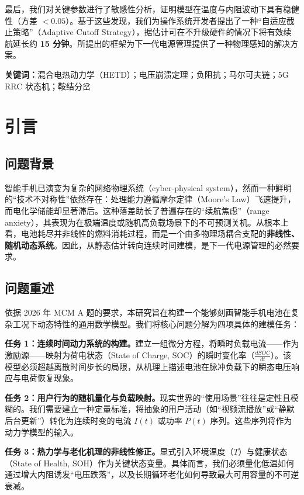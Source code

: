 \documentclass[11pt,a4paper]{ctexart}
\begin{document}
最后，我们对关键参数进行了敏感性分析，证明模型在温度与内阻波动下具有稳健性（方差 $< 0.05$）。基于这些发现，我们为操作系统开发者提出了一种“自适应截止策略”（Adaptive Cutoff Strategy），据估计可在不升级硬件的情况下将有效续航延长约 \textbf{15 分钟}。所提出的框架为下一代电源管理提供了一种物理感知的解决方案。

\noindent\textbf{关键词：}混合电热动力学（HETD）；电压崩溃定理；负阻抗；马尔可夫链；5G RRC 状态机；鞍结分岔

\newpage

\section{引言}

\subsection{问题背景}

智能手机已演变为复杂的网络物理系统（cyber-physical system），然而一种鲜明的“技术不对称性”依然存在：处理能力遵循摩尔定律（Moore's Law）飞速提升，而电化学储能却显著滞后。这种落差助长了普遍存在的“续航焦虑”（range anxiety），其表现为在极端温度或随机高负载场景下的不可预测关机。从根本上看，电池耗尽并非线性的燃料消耗过程，而是一个由多物理场耦合支配的\textbf{非线性、随机动态系统}。因此，从静态估计转向连续时间建模，是下一代电源管理的必然要求。

\subsection{问题重述}

依据 2026 年 MCM A 题的要求，本研究旨在构建一个能够刻画智能手机电池在复杂工况下动态特性的通用数学模型。我们将核心问题分解为四项具体的建模任务：

\textbf{任务 1：连续时间动力系统的构建。}建立一组微分方程，将瞬时负载电流——作为激励源——映射为荷电状态（State of Charge, SOC）的瞬时变化率（$\frac{dSOC}{dt}$）。该模型必须超越离散时间步长的局限，从机理上描述电池在脉冲负载下的瞬态电压响应与电荷恢复现象。

\textbf{任务 2：用户行为的随机量化与负载映射。}现实世界的“使用场景”往往是定性且模糊的。我们需要建立一种定量标准，将抽象的用户活动（如“视频流播放”或“静默后台更新”）转化为连续时变的电流 $I(t)$ 或功率 $P(t)$ 序列。这些序列将作为动力学模型的输入。

\textbf{任务 3：热力学与老化机理的非线性修正。}显式引入环境温度（$T$）与健康状态（State of Health, SOH）作为关键状态变量。具体而言，我们必须量化低温如何通过增大内阻诱发“电压跌落”，以及长期循环老化如何导致最大可用容量的不可逆衰减。
\end{document}

